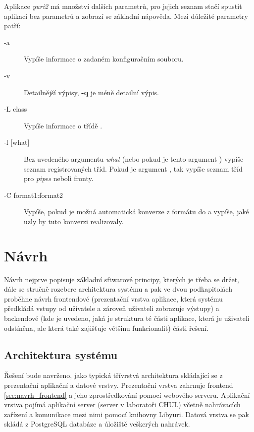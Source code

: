 \documentclass[thesis=M,czech]{FITthesis}[2012/06/26]
\begin{document}
\begin{description}
Aplikace \textit{yuri2} má množství dalších parametrů, pro jejich seznam stačí spustit aplikaci bez parametrů a zobrazí se základní nápověda. Mezi důležité parametry patří:

\begin{description}
	\item[-a] Vypíše informace o zadaném konfiguračním souboru.
	\item[-v] Detailnější výpisy, \textbf{-q} je méně detailní výpis.
	\item[-L class] Vypíše informace o třídě .
	\item[-l {[what]}] Bez uvedeného argumentu \textit{what} (nebo pokud je tento argument ) vypíše seznam registrovaných tříd. Pokud je argument , tak vypíše seznam tříd pro \textit{pipes} neboli fronty.
	\item[-C format1:format2] Vypíše, pokud je možná automatická konverze z formátu  do  a vypíše, jaké uzly by tuto konverzi realizovaly.
\end{description}

\end{description}




\chapter{Návrh} \label{chap:navrh}
Návrh nejprve popisuje základní sftwarové principy, kterých je třeba se držet, dále se stručně rozebere architektura systému a pak ve dvou podkapitolách proběhne návrh frontendové (prezentační vrstva aplikace, která systému předkládá vstupy od uživatele a zároveň uživateli zobrazuje výstupy) a backendové (kde je uvedeno, jaká je struktura té části aplikace, která je uživateli odstíněna, ale která také zajišťuje většinu funkcionalit) části řešení.

\section{Architektura systému} \label{sec:navrh_architektura}
Řešení bude navrženo, jako typická třívrstvá architektura skládající se z prezentační aplikační a datové vrstvy. Prezentační vrstva zahrnuje frontend \ref{sec:navrh_frontend} a jeho zprostředkování pomocí webového serveru. Aplikační vrstva pojímá aplikační server (server v laboratoři CHUL) včetně nahrávacích zařízení a komunikace mezi nimi pomocí knihovny Libyuri. Datová vrstva se pak skládá z PostgreSQL databáze a úložiště veškerých nahrávek.
\end{document}
